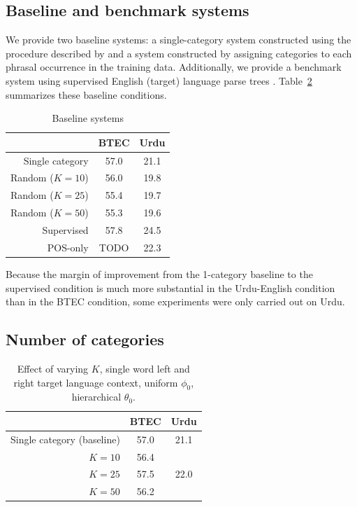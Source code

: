 \subsection{Baseline and benchmark systems}

We provide two baseline systems: a single-category system constructed using the procedure described by \cite{chiang:2007} and a system constructed by assigning categories to each phrasal occurrence in the training data.  Additionally, we provide a benchmark system using supervised English (target) language parse trees \citep{samt}.  Table~\ref{tab:npbaselines} summarizes these baseline conditions.

\begin{table}[h]
\caption{Baseline systems}
\begin{center}
\begin{tabular}{r|c|c}
& BTEC & Urdu \\
\hline
Single category \citep{chiang:2007} & 57.0 & 21.1 \\
\hline
Random ($K=10$) & 56.0 & 19.8 \\
Random ($K=25$) & 55.4 & 19.7 \\
Random ($K=50$) &  55.3 & 19.6 \\
\hline
Supervised \citep{samt} & 57.8 & 24.5 \\
POS-only & TODO & 22.3 \\
\end{tabular}
\end{center}
\label{tab:npbaselines}
\end{table}%

Because the margin of improvement from the 1-category baseline to the supervised condition is much more substantial in the Urdu-English condition than in the BTEC condition, some experiments were only carried out on Urdu.

\subsection{Number of categories}

\begin{table}[h]
\caption{Effect of varying $K$, single word left and right target language context, uniform $\phi_0$, hierarchical $\theta_0$.}
\begin{center}
\begin{tabular}{r|c|c}
& BTEC & Urdu \\
\hline
Single category (baseline) & 57.0 & 21.1 \\
\hline
$K=10$ & 56.4 & \\
$K=25$ & 57.5 & 22.0 \\
$K=50$ & 56.2 & \\
\end{tabular}
\end{center}
\label{tab:npbaselines}
\end{table}%

